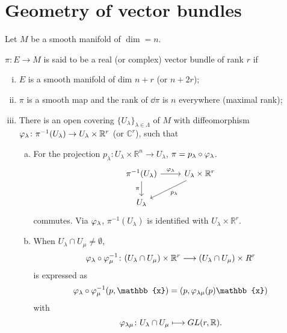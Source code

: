 \documentclass[12pt]{article}
\begin{document}
\section{Geometry of vector bundles}
Let \(M\) be a smooth manifold of \(\dim=n\).
\begin{definition}
    \(\pi\colon E\to M\) is said to be a real (or complex) vector bundle of rank \(r\)
    if
    \begin{enumerate}[(i)]
    \item \(E\) is a smooth manifold of dim \(n+r\) (or \(n+2r\));
    \item \(\pi\) is a smooth map and the rank of \(\dd{\pi}\) is \(n\) everywhere
        (maximal rank);
    \item There is an open covering \(\{U_\lambda\}_{\lambda\in \Lambda}\) of \(M\)
        with diffeomorphism \(\varphi_\lambda\colon \pi^{-1}(U_\lambda)\to U_\lambda
        \times \mathbb{R}^r\) (or \(\mathbb{C}^r\)), such that
        \begin{enumerate}[(a)]
        \item For the projection \(p_\lambda\colon U_\lambda\times \mathbb{R}^n\to 
            U_\lambda\), \(\pi=p_\lambda\circ \varphi_\lambda\). \ie\ 
            \[\begin{tikzcd}
                {\pi^{-1}(U_\lambda)} & {U_\lambda\times\mathbb{R}^r} \\
                {U_\lambda}
                \arrow["{\varphi_\lambda}", from=1-1, to=1-2]
                \arrow["\pi"', from=1-1, to=2-1]
                \arrow["{p_\lambda}", from=1-2, to=2-1]
            \end{tikzcd}\]
            commutes. Via \(\varphi_\lambda\), \(\pi^{-1}(U_\lambda)\) is identified with
            \(U_\lambda\times \mathbb{R}^r\).
        \item When \(U_\lambda\cap U_\mu\neq \emptyset\), \[
            \varphi_\lambda\circ \varphi_\mu^{-1}\colon (U_\lambda\cap U_\mu)\times
            \mathbb{R}^r\longrightarrow (U_\lambda\cap U_\mu)\times R^r
        \] is expressed as \[
            \vphi_\lambda\circ \vphi_\mu^{-1}(p,\mathbb{x})=(p,\vphi_{\lambda\mu}(p)
            \mathbb{x})
        \] with \[
            \varphi_{\lambda\mu}\colon U_\lambda\cap U_\mu\longmapsto
            GL(r,\mathbb{R})
        .\] 
        \end{enumerate}
    \end{enumerate}
\end{definition}
\end{document}
